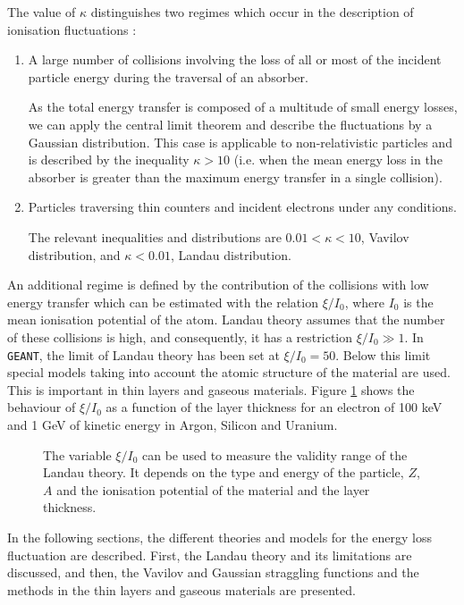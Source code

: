 The value of $\kappa$ distinguishes two regimes which occur in the description
of ionisation fluctuations :
 
\begin{enumerate}
\item A large number of collisions involving the loss of all or most
of the incident particle energy during the traversal of an
absorber.

As the total energy transfer is composed of a multitude of small energy
losses, we can apply the central limit theorem and describe the
fluctuations by a Gaussian distribution.
This case is applicable to non-relativistic particles and is described by
the inequality  $\kappa > 10  $
(i.e. when the mean energy loss in the absorber is greater than
the maximum energy transfer in a single collision).

\item
Particles traversing thin counters and incident electrons under any conditions.

The relevant inequalities and distributions are
 $ 0.01 < \kappa < 10 $, Vavilov distribution, and
$\kappa < 0.01 $, Landau distribution.
\end{enumerate}

An additional regime is defined by
the contribution of the collisions with low energy transfer
which can be estimated with the relation $\xi/I_0$, where $I_0$
is the mean ionisation potential of the atom.
Landau theory assumes that the number of these collisions
is high, and consequently, it has a restriction $\xi/I_0 \gg 1$.
In {\tt GEANT}, the limit of Landau theory has been set at $\xi/I_0 = 50$.
Below this limit special models taking into account the
atomic structure of the material are used. 
This is important in thin layers and gaseous materials.
Figure \ref{fg:phys332-1} shows the behaviour of $\xi/I_0$ 
as a function of the layer thickness for an electron of
100 keV and 1 GeV of kinetic energy in Argon, Silicon and Uranium.

\begin{figure}[hbt]
   \centering
   \caption{The variable $\xi/I_0$ can be used to measure the 
            validity range of the Landau theory. It depends
            on the type and energy of the particle, $Z$, $A$
            and the ionisation potential of the material and
            the layer thickness. 
            }
    \label{fg:phys332-1}
\end{figure}

In the following sections, the different theories and models
for the energy loss fluctuation are described. First, the
Landau theory and its limitations are discussed, and then,
the Vavilov and Gaussian straggling functions and the
methods in the thin layers and gaseous materials are presented.

